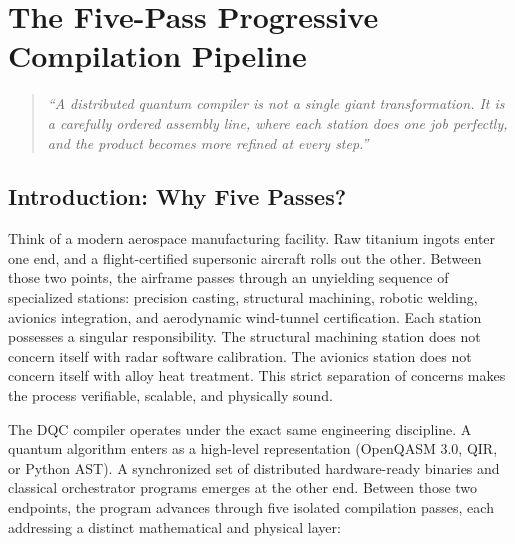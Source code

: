 \chapter{The Five-Pass Progressive Compilation Pipeline}
\label{ch:five_pass_pipeline}

\begin{quote}
\textit{``A distributed quantum compiler is not a single giant transformation. It is a carefully ordered assembly line, where each station does one job perfectly, and the product becomes more refined at every step.''}
\end{quote}


\section{Introduction: Why Five Passes?}

Think of a modern aerospace manufacturing facility. Raw titanium ingots enter one end, and a flight-certified supersonic aircraft rolls out the other. Between those two points, the airframe passes through an unyielding sequence of specialized stations: precision casting, structural machining, robotic welding, avionics integration, and aerodynamic wind-tunnel certification. Each station possesses a singular responsibility. The structural machining station does not concern itself with radar software calibration. The avionics station does not concern itself with alloy heat treatment. This strict separation of concerns makes the process verifiable, scalable, and physically sound.

The DQC compiler operates under the exact same engineering discipline. A quantum algorithm enters as a high-level representation (OpenQASM 3.0, QIR, or Python AST). A synchronized set of distributed hardware-ready binaries and classical orchestrator programs emerges at the other end. Between those two endpoints, the program advances through five isolated compilation passes, each addressing a distinct mathematical and physical layer:


